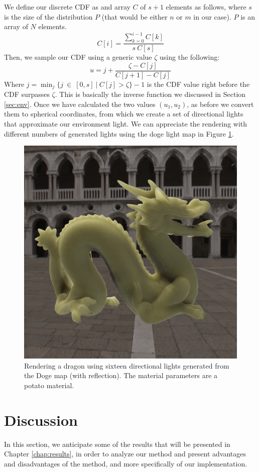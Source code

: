 We define our discrete CDF as and array $C$ of $s+1$ elements as follows, where $s$ is the size of the distribution $P$ (that would be either $n$ or $m$ in our case). $P$ is an array of $N$ elements.
$$
C[i] = \frac{\sum_{k = 0}^{i-1} C[k]}{s\ C[s]}
$$
Then, we sample our CDF using a generic value $\zeta$ using the following:
$$
u = j + \frac{\zeta - C[j]}{C[j + 1] - C[j]}
$$
Where $j = \min_j\{j\ \in\ [0,s]\ |\ C[j] > \zeta \} - 1$ is the CDF value right before the CDF surpasses $\zeta$. This is basically the inverse function we discussed in Section \ref{sec:env}. Once we have calculated the two values $(u_1,u_2)$, as before we convert them to spherical coordinates, from which we create a set of directional lights that approximate our environment light. We can appreciate the rendering with different numbers of generated lights using the doge light map in Figure \ref{fig:doge_render_grape}.

\begin{figure}
\centering

\includegraphics[width=0.9 \linewidth]{images/results/skymap_1.png}
\caption{Rendering a dragon using sixteen directional lights generated from the Doge map (with reflection). The material parameters are a potato material.}
\label{fig:doge_render_grape}
\end{figure}

\section{Discussion}
In this section, we anticipate some of the results that will be presented in Chapter \ref{chap:results}, in order to analyze our method and present advantages and disadvantages of the method, and more specifically of our implementation.

